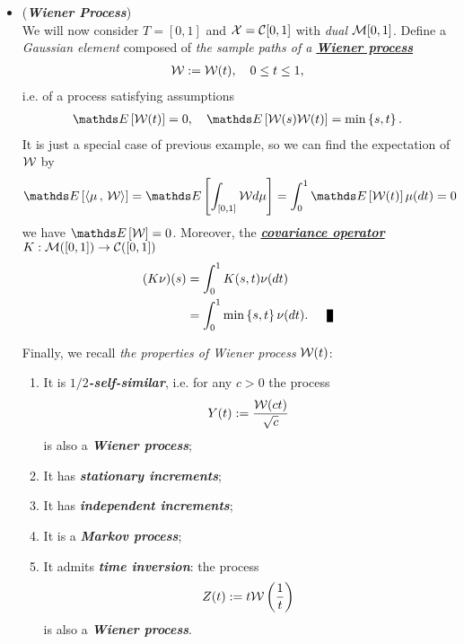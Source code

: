 \documentclass[11pt]{article}
\begin{document}
\begin{itemize}
\begin{example}
\end{example}

\item \begin{example} (\emph{\textbf{Wiener Process}}) \citep{lifshits2012lectures}\\
We will now consider $T = [0,1]$ and ${\mathcal X} = {\mathcal C}[0,1]$ with \emph{dual} ${\mathcal M}[0,1]$.  Define a \emph{Gaussian element} composed of \emph{the sample paths of a \underline{\textbf{Wiener process}}} 
\begin{align*}
{\mathcal W} := {\mathcal W}(t), \quad   0 \le t \le 1,
\end{align*} i.e. of a process satisfying assumptions
\begin{align*}
\E{}{\cW(t)} = 0, \quad  \E{}{\cW(s) \cW(t)} = \min\set{s, t}.
\end{align*} It is just a special case of previous example, so we can find the expectation of ${\mathcal W}$ by
\begin{align*}
\E{}{\inn{\mu}{\cW}} = \E{}{\int_{[0,1]} \cW d\mu} = \int_{0}^{1}\E{}{\cW(t)} \mu(dt) = 0
\end{align*}
we have $\E{}{\cW} = 0$. Moreover,  the \underline{\emph{\textbf{covariance operator}} $K:  {\mathcal M}([0,1]) \to {\mathcal C}([0,1])$} 
\begin{align*}
(K\nu)(s) &=  \int_{0}^1 K(s, t) \nu(dt) \\
&= \int_{0}^1  \min\set{s, t} \nu(dt).  \qed
\end{align*}
\end{example}

\begin{remark}
Finally, we recall \emph{the properties of Wiener process} ${\mathcal W}(t)$: \citep{lifshits2012lectures}
\begin{enumerate}
\item  It is \emph{\textbf{$1/2$-self-similar}}, i.e. for any $c > 0$ the process 
\begin{align*}
Y(t) := \frac{{\mathcal W}(ct)}{\sqrt{c}}
\end{align*}  is also a \emph{\textbf{Wiener process}};
\item It has \emph{\textbf{stationary increments}};
\item It has \emph{\textbf{independent increments}};
\item It is a \emph{\textbf{Markov process}};
\item It admits \emph{\textbf{time inversion}}: the process 
\begin{align*}
Z(t) := t{\mathcal W}\left(\frac{1}{t}\right)
\end{align*} is also a \emph{\textbf{Wiener process}}.
\end{enumerate}
\end{remark}

\end{itemize}
\end{document}

